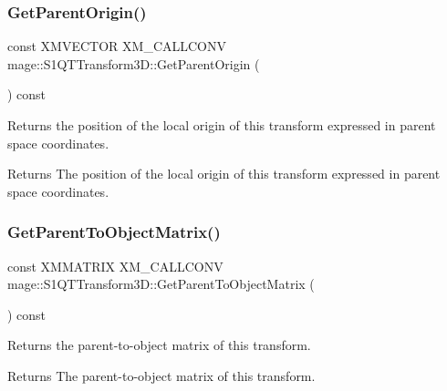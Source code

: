 \subsubsection{\texorpdfstring{Get\+Parent\+Origin()}{GetParentOrigin()}}
{\footnotesize\ttfamily const X\+M\+V\+E\+C\+T\+OR X\+M\+\_\+\+C\+A\+L\+L\+C\+O\+NV mage\+::\+S1\+Q\+T\+Transform3\+D\+::\+Get\+Parent\+Origin (\begin{DoxyParamCaption}{ }\end{DoxyParamCaption}) const\hspace{0.3cm}{\ttfamily [noexcept]}}

Returns the position of the local origin of this transform expressed in parent space coordinates.

\begin{DoxyReturn}{Returns}
The position of the local origin of this transform expressed in parent space coordinates. 
\end{DoxyReturn}
\mbox{\label{classmage_1_1_s1_q_t_transform3_d_ad9d7ec001a3ae7144aee3c0278798919}} 
\subsubsection{\texorpdfstring{Get\+Parent\+To\+Object\+Matrix()}{GetParentToObjectMatrix()}}
{\footnotesize\ttfamily const X\+M\+M\+A\+T\+R\+IX X\+M\+\_\+\+C\+A\+L\+L\+C\+O\+NV mage\+::\+S1\+Q\+T\+Transform3\+D\+::\+Get\+Parent\+To\+Object\+Matrix (\begin{DoxyParamCaption}{ }\end{DoxyParamCaption}) const\hspace{0.3cm}{\ttfamily [noexcept]}}

Returns the parent-\/to-\/object matrix of this transform.

\begin{DoxyReturn}{Returns}
The parent-\/to-\/object matrix of this transform. 
\end{DoxyReturn}
\mbox{\label{classmage_1_1_s1_q_t_transform3_d_a7400c38a3a11b6d08b551761772c3b13}} 
